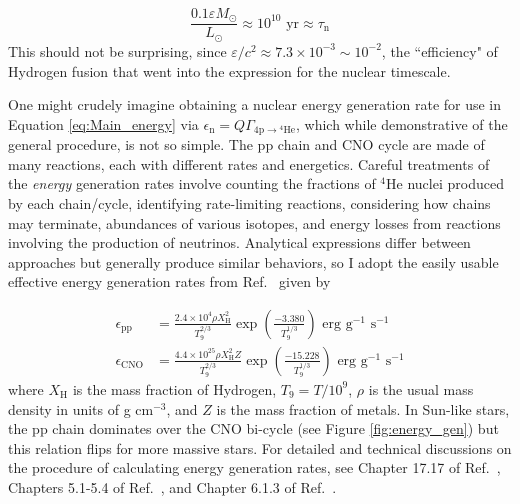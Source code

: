 \documentclass[12pt]{article}
\begin{document}
\begin{equation}
    \frac{0.1 \varepsilon M_\odot}{L_\odot} \approx 10^{10} \text{ yr} \approx \tau_\mathrm{n}
\end{equation}
%
This should not be surprising, since $\varepsilon/c^2 \approx 7.3\times 10^{-3} \sim 10^{-2}$, the ``efficiency" of Hydrogen fusion that went into the expression for the nuclear timescale.

One might crudely imagine obtaining a nuclear energy generation rate for use in Equation \ref{eq:Main_energy} via $\epsilon_\mathrm{n} = Q\Gamma_{4\mathrm{p} \rightarrow \text{} ^4\text{He}}$, which while demonstrative of the general procedure, is not so simple. The pp chain and CNO cycle are made of many reactions, each with different rates and energetics. Careful treatments of the \textit{energy} generation rates involve counting the fractions of $^4$He nuclei produced by each chain/cycle, identifying rate-limiting reactions, considering how chains may terminate, abundances of various isotopes, and energy losses from reactions involving the production of neutrinos. Analytical expressions differ between approaches but generally produce similar behaviors, so I adopt the easily usable effective energy generation rates from Ref.~\cite{KWW_book} given by

\begin{align}
    \epsilon_\mathrm{pp} &= \frac{2.4 \times 10^{4} \rho X_\mathrm{H}^2}{T_9^{2/3}}\exp\left(\frac{-3.380}{T_9^{1/3}}\right) \text{ erg} \text{ g}^{-1} \text{ s}^{-1} \\
    \epsilon_\mathrm{CNO} &= \frac{4.4\times10^{25} \rho X_\mathrm{H}^2 Z}{T_9^{2/3}} \exp\left(\frac{-15.228}{T_9^{1/3}}\right) \text{ erg} \text{ g}^{-1} \text{ s}^{-1}
\end{align}
%
where $X_\mathrm{H}$ is the mass fraction of Hydrogen, $T_9 = T/10^9$, $\rho$ is the usual mass density in units of g cm$^{-3}$, and $Z$ is the mass fraction of metals. In Sun-like stars, the pp chain dominates over the CNO bi-cycle (see Figure \ref{fig:energy_gen}) but this relation flips for more massive stars.  For detailed and technical discussions on the procedure of calculating energy generation rates, see Chapter 17.17 of Ref.~\cite{Cox_Giuli_vol1}, Chapters 5.1-5.4 of Ref.~\cite{Clayton1983}, and Chapter 6.1.3 of Ref.~\cite{Rolfs1988}.
\end{document}
